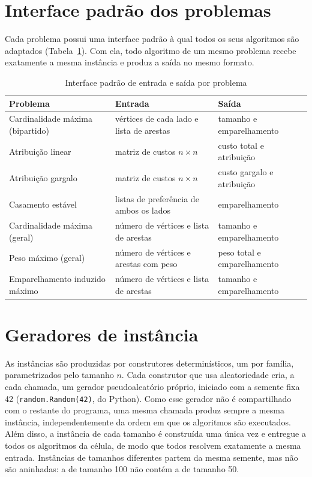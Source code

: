 \section{Interface padrão dos problemas}

Cada problema possui uma interface padrão à qual todos os seus algoritmos são
adaptados (Tabela~\ref{tab:interfaces}). Com ela, todo algoritmo de um mesmo
problema recebe exatamente a mesma instância e produz a saída no mesmo formato.

\begin{table}[H]
    \centering
    \caption{Interface padrão de entrada e saída por problema}
    \label{tab:interfaces}
    \renewcommand{\arraystretch}{1.3}
    \footnotesize
    \begin{tabularx}{\textwidth}{@{} l X X @{}}
        \toprule
        \textbf{Problema} & \textbf{Entrada} & \textbf{Saída} \\
        \midrule
        Cardinalidade máxima (bipartido) & vértices de cada lado e lista de arestas & tamanho e emparelhamento \\
        Atribuição linear & matriz de custos $n \times n$ & custo total e atribuição \\
        Atribuição gargalo & matriz de custos $n \times n$ & custo gargalo e atribuição \\
        Casamento estável & listas de preferência de ambos os lados & emparelhamento \\
        Cardinalidade máxima (geral) & número de vértices e lista de arestas & tamanho e emparelhamento \\
        Peso máximo (geral) & número de vértices e arestas com peso & peso total e emparelhamento \\
        Emparelhamento induzido máximo & número de vértices e lista de arestas & tamanho e emparelhamento \\
        \bottomrule
    \end{tabularx}
\end{table}

\section{Geradores de instância}
\label{sec:geradores}

As instâncias são produzidas por construtores determinísticos, um por família, parametrizados pelo tamanho $n$. Cada construtor que usa aleatoriedade cria, a cada chamada, um gerador pseudoaleatório próprio, iniciado com a semente fixa 42 (\texttt{random.Random(42)}, do Python). Como esse gerador não é compartilhado com o restante do programa, uma mesma chamada produz sempre a mesma instância, independentemente da ordem em que os algoritmos são executados. Além disso, a instância de cada tamanho é construída uma única vez e entregue a todos os algoritmos da célula, de modo que todos resolvem exatamente a mesma entrada. Instâncias de tamanhos diferentes partem da mesma semente, mas não são aninhadas: a de tamanho 100 não contém a de tamanho 50.

